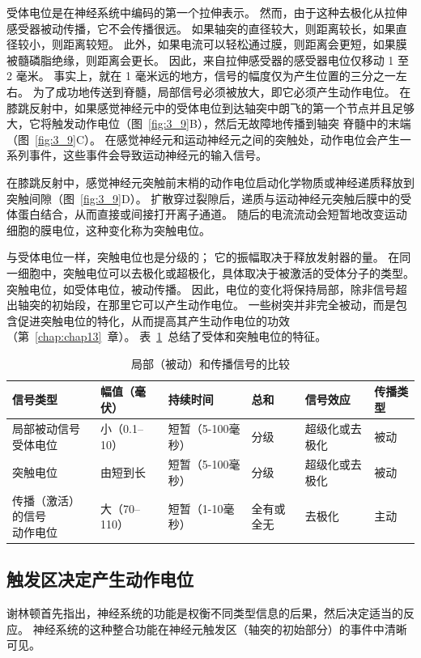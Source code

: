 受体电位是在神经系统中编码的第一个拉伸表示。
然而，由于这种去极化从拉伸感受器被动传播，它不会传播很远。
如果轴突的直径较大，则距离较长，如果直径较小，则距离较短。
此外，如果电流可以轻松通过膜，则距离会更短，如果膜被髓磷脂绝缘，则距离会更长。
因此，来自拉伸感受器的感受器电位仅移动 1 至 2 毫米。
事实上，就在 1 毫米远的地方，信号的幅度仅为产生位置的三分之一左右。 
为了成功地传送到脊髓，局部信号必须被放大，即它必须产生动作电位。
在膝跳反射中，如果感觉神经元中的受体电位到达轴突中朗飞的第一个节点并且足够大，它将触发动作电位（图~\ref{fig:3_9}B），然后无故障地传播到轴突 脊髓中的末端（图~\ref{fig:3_9}C）。 
在感觉神经元和运动神经元之间的突触处，动作电位会产生一系列事件，这些事件会导致运动神经元的输入信号。


在膝跳反射中，感觉神经元突触前末梢的动作电位启动化学物质或神经递质释放到突触间隙（图~\ref{fig:3_9}D）。
扩散穿过裂隙后，递质与运动神经元突触后膜中的受体蛋白结合，从而直接或间接打开离子通道。
随后的电流流动会短暂地改变运动细胞的膜电位，这种变化称为突触电位。


与受体电位一样，突触电位也是分级的； 
它的振幅取决于释放发射器的量。 
在同一细胞中，突触电位可以去极化或超极化，具体取决于被激活的受体分子的类型。 
突触电位，如受体电位，被动传播。 
因此，电位的变化将保持局部，除非信号超出轴突的初始段，在那里它可以产生动作电位。 
一些树突并非完全被动，而是包含促进突触电位的特化，从而提高其产生动作电位的功效（第~\ref{chap:chap13}~章）。 
表~\ref{tab:3_1}~总结了受体和突触电位的特征。


\begin{table}[htbp]
	\caption{局部（被动）和传播信号的比较} \label{tab:3_1} \centering
	\begin{tabular}{llllll}
		\toprule
		信号类型 & 幅值（毫伏） & 持续时间 & 总和 & 信号效应 & 传播类型\\
		\midrule
		\makecell{局部被动信号\\受体电位} & 小（0.1–10） & 短暂（5-100毫秒） & 分级 & 超级化或去极化 & 被动 \\
		\midrule
		突触电位 & 由短到长 & 短暂（5-100毫秒） & 分级 & 超级化或去极化 & 被动 \\
		\makecell{传播（激活）的信号\\动作电位} & 大（70–110） & 短暂（1-10毫秒） & 全有或全无 & 
		去极化 & 主动 \\
		\bottomrule
	\end{tabular}
\end{table}


\subsection{触发区决定产生动作电位}
谢林顿首先指出，神经系统的功能是权衡不同类型信息的后果，然后决定适当的反应。 
神经系统的这种整合功能在神经元触发区（轴突的初始部分）的事件中清晰可见。


